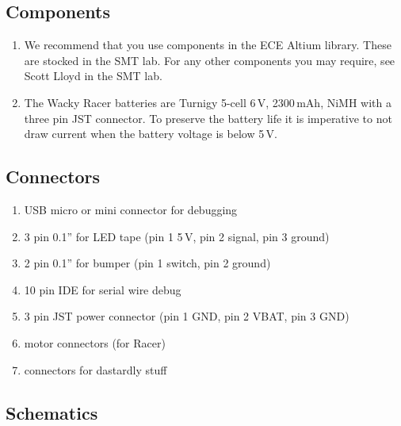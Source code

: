 \documentclass[11pt, a4paper]{article}
\begin{document}
\subsection{Components}

\begin{enumerate}
\item We recommend that you use components in the ECE Altium library.
  These are stocked in the SMT lab.  For any other components you may
  require, see Scott Lloyd in the SMT lab.

\item The Wacky Racer batteries are Turnigy 5-cell 6\,V, 2300\,mAh,
  NiMH with a three pin JST connector.  To preserve the battery life
  it is imperative to not draw current when the battery voltage is
  below 5\,V.
\end{enumerate}


\subsection{Connectors}

\begin{enumerate}
\item USB micro or mini connector for debugging
\item 3 pin 0.1'' for LED tape (pin 1 5\,V, pin 2 signal, pin 3 ground)
\item 2 pin 0.1'' for bumper (pin 1 switch, pin 2 ground)
\item 10 pin IDE for serial wire debug  
\item 3 pin JST power connector (pin 1 GND, pin 2 VBAT, pin 3 GND)
\item motor connectors (for Racer)
\item connectors for dastardly stuff
\end{enumerate}


\subsection{Schematics}
\end{document}
